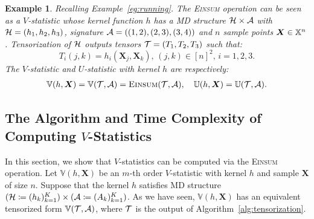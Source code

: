 \documentclass[letterpaper,11pt]{article}
\newtheorem{subexample}{Example}
\def\Einsum{\textsc{Einsum}}
\newcommand{\pdfv}{\texorpdfstring{$V$}{V}}
\newcommand{\ustat}{\mathbb{U}}
\newcommand{\vstat}{\mathbb{V}}
\newcommand{\samplespace}{\bbX}
\begin{document}
\begin{bibunit}[plainnat]
\setcounter{example}{3}
\begin{subexample}
\label{eg:running-a}
Recalling Example~\ref{eg:running}. The \Einsum{} operation can be seen as a $V$-statistic whose kernel function $h$ has a MD structure ${\mathcal{H}} \times {\mathcal{A}}$ with ${\mathcal{H}} = (h_1, h_2, h_3)$, signature ${\mathcal{A}} = ( (1,2),(2,3),(3,4))$ and $n$ sample points $\bm{X} \in \samplespace^{n}$. Tensorization of ${\mathcal{H}}$ outputs tensors ${\mathcal{T}} = ( T_1, T_2, T_3)$ such that:
\begin{equation*}
T_i (j,k) = h_i (\bm{X}_{j}, \bm{X}_{k}),  \, (j,k) \in [n]^2,  \, i = 1,2,3.
\end{equation*}
The $V$-statistic and $U$-statistic with kernel $h$ are respectively:
\begin{align*}
\vstat(h, \bm{X}) = \vstat (\calT, \calA) = \Einsum{}(\calT, \calA), \quad \ustat(h, \bm{X}) = \ustat(\calT, \calA).
\end{align*}
\end{subexample}

\subsection{The Algorithm and Time Complexity of Computing \pdfv{}-Statistics}
\label{sec:alg_v}

In this section, we show that $V$-statistics can be computed via the \Einsum{} operation. Let $\vstat(h, \bm{X})$ be an $m$-th order $V$-statistic with kernel $h$ and sample $\bm{X}$ of size $n$. Suppose that the kernel $h$ satisfies MD structure $({\mathcal{H}} \coloneqq (h_k)_{k=1}^K) \times ({\mathcal{A}} \coloneqq (A_k)_{k=1}^K)$. As we have seen, $\vstat(h, \bm{X})$ has an equivalent tensorized form $\vstat(\calT, \calA)$, where ${\mathcal{T}}$ is the output of Algorithm~\ref{alg:tensorization}. 


\end{bibunit}
\end{document}
